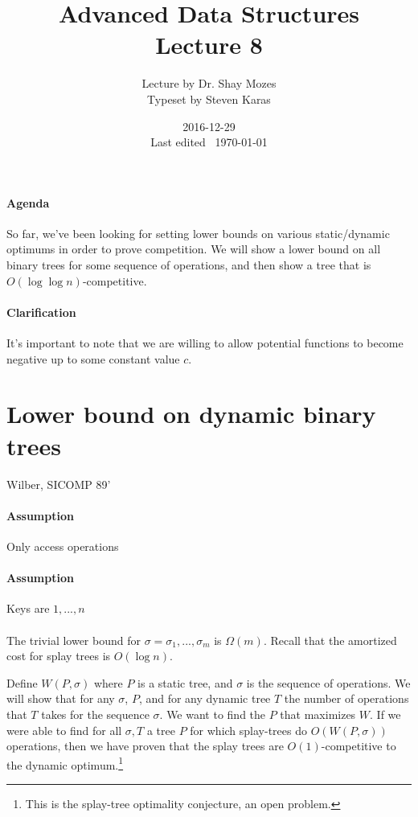 \documentclass[a4paper]{article}
\title{Advanced Data Structures\\\large Lecture 8}
\date{2016-12-29 \\ Last edited \currenttime\ \today}
\author{Lecture by Dr. Shay Mozes\\Typeset by Steven Karas}
\begin{document}
\maketitle

\paragraph{Agenda}
So far, we've been looking for setting lower bounds on various static/dynamic optimums in order to prove competition. We will show a lower bound on all binary trees for some sequence of operations, and then show a tree that is $O(\log\log n)$-competitive.

\paragraph{Clarification}
It's important to note that we are willing to allow potential functions to become negative up to some constant value $c$.

\section{Lower bound on dynamic binary trees}
Wilber, SICOMP 89'

\paragraph{Assumption}
Only access operations

\paragraph{Assumption}
Keys are $1,...,n$

\paragraph{}
The trivial lower bound for $\sigma = \sigma_1,...,\sigma_m$ is $\Omega(m)$. Recall that the amortized cost for splay trees is $O(\log n)$.

Define $W(P, \sigma)$ where $P$ is a static tree, and $\sigma$ is the sequence of operations.
We will show that for any $\sigma$, $P$, and for any dynamic tree $T$ the number of operations that $T$ takes for the sequence $\sigma$.
We want to find the $P$ that maximizes $W$.
If we were able to find for all $\sigma, T$ a tree $P$ for which splay-trees do $O(W(P, \sigma))$ operations, then we have proven that the splay trees are $O(1)$-competitive to the dynamic optimum.\footnote{This is the splay-tree optimality conjecture, an open problem.}
\end{document}
